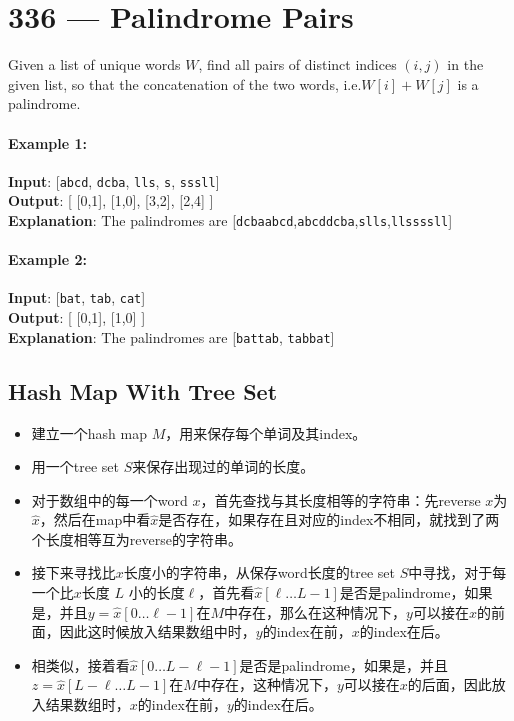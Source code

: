 \section{336 --- Palindrome Pairs}
Given a list of unique words $ W $, find all pairs of distinct indices $ (i, j) $ in the given list, so that the concatenation of the two words, i.e.$ W[i] + W[j]$ is a palindrome.

\paragraph{Example 1:}

\begin{flushleft}
\textbf{Input}: [\texttt{abcd}, \texttt{dcba}, \texttt{lls}, \texttt{s}, \texttt{sssll}]
\\
\textbf{Output}: [ [0,1], [1,0], [3,2], [2,4] ] 
\\
\textbf{Explanation}: The palindromes are [\texttt{dcbaabcd},\texttt{abcddcba},\texttt{slls},\texttt{llssssll}]
\end{flushleft}

\paragraph{Example 2:}

\begin{flushleft}
\textbf{Input}: [\texttt{bat}, \texttt{tab}, \texttt{cat}]
\\
\textbf{Output}: [ [0,1], [1,0] ] 
\\
\textbf{Explanation}: The palindromes are [\texttt{battab}, \texttt{tabbat}]
\end{flushleft}

\subsection{Hash Map With Tree Set}
\begin{itemize}
\item 建立一个hash map $ M $，用来保存每个单词及其index。
\item 用一个tree set $ S $来保存出现过的单词的长度。
\item 对于数组中的每一个word $ x $，首先查找与其长度相等的字符串：先reverse $ x $为$ \hat{x} $，然后在map中看$ \hat{x} $是否存在，如果存在且对应的index不相同，就找到了两个长度相等互为reverse的字符串。
\item 接下来寻找比$ x $长度小的字符串，从保存word长度的tree set $ S $中寻找，对于每一个比$ x $长度 $ L $ 小的长度$ \ell $，首先看$ \hat{x}[\ell\ldots L-1] $是否是palindrome，如果是，并且$ y=\hat{x}[0\ldots\ell-1] $在$ M $中存在，那么在这种情况下，$ y $可以接在$ x $的前面，因此这时候放入结果数组中时，$ y $的index在前，$ x $的index在后。
\item 相类似，接着看$ \hat{x}[0\ldots L-\ell-1] $是否是palindrome，如果是，并且$ z=\hat{x}[L-\ell\ldots L-1] $在$ M $中存在，这种情况下，$ y $可以接在$ x $的后面，因此放入结果数组时，$ x $的index在前，$ y $的index在后。
\end{itemize}

